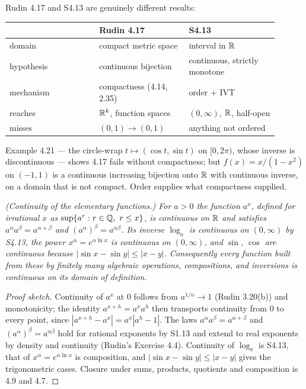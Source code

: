 \begin{deeper}
Rudin 4.17 and S4.13 are genuinely different results:

\smallskip
\begin{tabular}{@{}p{0.30\linewidth}p{0.30\linewidth}p{0.30\linewidth}@{}}
\toprule
& \textbf{Rudin 4.17} & \textbf{S4.13} \\
\midrule
domain      & compact metric space   & interval in $\mathbb{R}$ \\
hypothesis  & continuous bijection   & continuous, strictly monotone \\
mechanism   & compactness (4.14, 2.35)& order + IVT \\
reaches     & $\mathbb{R}^k$, function spaces & $(0,\infty)$, $\mathbb{R}$, half-open \\
misses      & $(0,1) \to (0,1)$       & anything not ordered \\
\bottomrule
\end{tabular}

\smallskip
Example 4.21 --- the circle-wrap $t \mapsto (\cos t, \sin t)$ on $[0,2\pi)$,
whose inverse is discontinuous --- shows 4.17 fails without compactness; but
$f(x) = x/(1-x^2)$ on $(-1,1)$ is a continuous increasing bijection onto
$\mathbb{R}$ with continuous inverse, on a domain that is not compact. Order
supplies what compactness supplied.
\end{deeper}

\emph{(Continuity of the elementary functions.) For $a>0$ the function
$a^x$, defined for irrational $x$ as $\sup\{a^r : r \in \mathbb{Q},\ r \le x\}$, is
continuous on $\mathbb{R}$ and satisfies $a^{\alpha}a^{\beta}=a^{\alpha+\beta}$ and
$(a^{\alpha})^{\beta}=a^{\alpha\beta}$. Its inverse $\log_a$ is continuous
on $(0,\infty)$ by S4.13, the power $x^{\alpha}=e^{\alpha\ln x}$ is
continuous on $(0,\infty)$, and $\sin$, $\cos$ are continuous because
$|\sin x - \sin y| \le |x-y|$. Consequently every function built from these
by finitely many algebraic operations, compositions, and inversions is
continuous on its domain of definition.}
\begin{proof}[Proof sketch]
Continuity of $a^x$ at $0$ follows from $a^{1/n}\to1$ (Rudin 3.20(b)) and
monotonicity; the identity $a^{x+h}=a^xa^h$ then transports continuity from
$0$ to every point, since $|a^{x+h}-a^x| = a^x|a^h-1|$. The laws
$a^{\alpha}a^{\beta}=a^{\alpha+\beta}$ and
$(a^{\alpha})^{\beta}=a^{\alpha\beta}$ hold for rational exponents by S1.13
and extend to real exponents by density and continuity (Rudin's Exercise
4.4). Continuity of $\log_a$ is S4.13, that of $x^{\alpha}=e^{\alpha\ln x}$
is composition, and $|\sin x - \sin y| \le |x-y|$ gives the trigonometric
cases. Closure under sums, products, quotients and composition is 4.9 and
4.7.
\end{proof}

